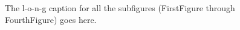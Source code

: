 \begin{figure}[ht!]
\begin{center}
%
    \end{center}
    \caption{%
        The l-o-n-g caption for all the subfigures
        (FirstFigure through FourthFigure) goes here.
     }%
   \label{fig:subfigures}
\end{figure}


